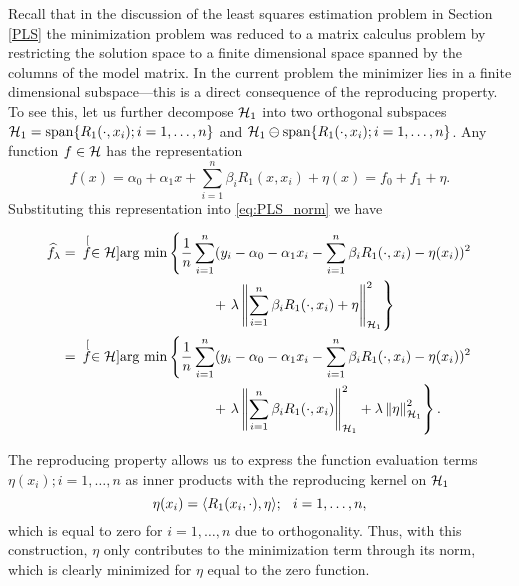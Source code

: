 Recall that in the discussion of the least squares estimation problem in Section \ref{PLS} the minimization problem was reduced to a matrix calculus problem by restricting the solution space to a finite dimensional space spanned by the columns of the model matrix. In the current problem the minimizer lies in a finite dimensional subspace---this is a direct consequence of the reproducing property. To see this, let us further decompose $\mathcal{H}_1$ into two orthogonal subspaces $\mathcal{H}_1 =\mbox{span}\{R_1(\cdot,x_i); i = 1,\dots, n\}$ and $\mathcal{H}_1\ominus \mbox{span}\{R_1(\cdot,x_i); i = 1,\dots, n\}$. Any function $f \in  \mathcal{H}$  has the representation 
\begin{equation*}
f(x) = \alpha_0 + \alpha_1x + \sum_{i=1}^n \beta_iR_1(x, x_i) + \eta(x)=f_0 + f_{1} + \eta.
\label{eq:ds_representation} %
\end{equation*}
Substituting this representation into \eqref{eq:PLS_norm} we have 

\begin{align}
\widehat{f}_{\lambda} &= \hspace{.07in}\stackrel[f \in \mathcal{H}]{}{\mbox{arg min}} 
\left\{ \frac{1}{n}\sum_{i=1}^{n}(y_i - \alpha_0 - \alpha_1x_i - \sum_{i=1}^n \beta_iR_1(\cdot, x_i) - \eta(x_i))^2 \right. \nonumber \\
	 & \mbox{\hspace{1.5in}} + \left. \lambda\left\|\sum_{i=1}^n \beta_iR_1(\cdot, x_i) + \eta\right\|^2_{\mathcal{H}_1} \right\} \nonumber \\
	 & = \hspace{.07in}\stackrel[f \in \mathcal{H}]{}{\mbox{arg min}} \left\{ \frac{1}{n}\sum_{i=1}^{n}(y_i - \alpha_0 - \alpha_1x_i - \sum_{i=1}^n \beta_iR_1(\cdot, x_i) - \eta(x_i))^2 \right. \nonumber \\
  & \mbox{\hspace{1.5in}} + \left. \lambda\left\|\sum_{i=1}^n \beta_iR_1(\cdot, x_i) \right\|^2_{\mathcal{H}_1} + \lambda\left\|\eta\right\|^2_{\mathcal{H}_1} \right\}.
\label{eq:PLS_norm2}
\end{align}

The reproducing property allows us to express the function evaluation terms $\eta(x_i); i = 1,\dots, n$ as inner products with the reproducing kernel on $\mathcal{H}_1$
\begin{equation*}
\eta(x_i) = \langle R_1(x_i,\cdot), \eta \rangle; \hspace{0.1in} i = 1,\dots,n,
\label{eq:rep_property}
\end{equation*}
which is equal to zero for $i=1,\dots,n$ due to orthogonality. Thus, with this construction, $\eta$ only contributes to the minimization term through its norm, which is clearly minimized for $\eta$ equal to the zero function.

